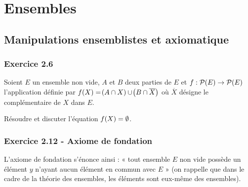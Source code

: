 \documentclass[a4paper,french,bookmarks]{article}
\begin{document}
    \section{Ensembles}

    \subsection{Manipulations ensemblistes et axiomatique}

    \subsubsection*{Exercice 2.6}

    Soient $E$ un ensemble non vide, $A$ et $B$ deux parties de $E$ et $f : \mathcal{P}\!\left(E\right) \to \mathcal{P}\!\left(E\right)$ l'application définie par $f\!\left(X\right) = \!\left(A \cap X\right) \cup \!\left(B \cap \overline{X}\right)$ où $\overline{X}$ désigne le complémentaire de $X$ dans $E$.

    Résoudre et discuter l'équation $f\!\left(X\right) = \emptyset$.

    
    \subsubsection*{Exercice 2.12 - Axiome de fondation}
    
    L'axiome de fondation s'énonce ainsi : « tout ensemble $E$ non vide possède un élément $y$ n'ayant aucun élément en commun avec $E$ » (on rappelle que dans le cadre de la théorie des ensembles, les éléments sont eux-même des ensembles).
\end{document}
